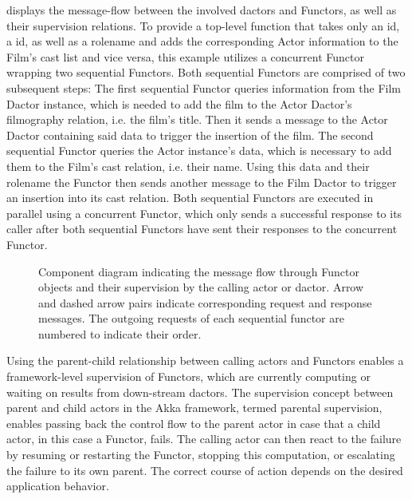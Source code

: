      displays the message-flow between the involved \glspl{dactor} and Functors, as well as their supervision relations.
    To provide a top-level function that takes only an  id, a  id, as well as a rolename and adds the corresponding Actor information to the Film's cast list and vice versa, this example utilizes a concurrent Functor wrapping two sequential Functors.
    Both sequential Functors are comprised of two subsequent steps:
    The first sequential Functor queries information from the Film Dactor instance, which is needed to add the film to the Actor Dactor's filmography \gls{relation}, i.e. the film's title.
    Then it sends a message to the Actor Dactor containing said data to trigger the insertion of the film.
    The second sequential Functor queries the Actor instance's data, which is necessary to add them to the Film's cast \gls{relation}, i.e. their name.
    Using this data and their rolename the Functor then sends another message to the Film Dactor to trigger an insertion into its cast \gls{relation}.
    Both sequential Functors are executed in parallel using a concurrent Functor, which only sends a successful response to its caller after both sequential Functors have sent their responses to the concurrent Functor.
    
    \begin{figure}[t]
      \centering
      
      \caption{Component diagram indicating the message flow through Functor objects and their supervision by the calling actor or \gls{dactor}. Arrow and dashed arrow pairs indicate corresponding request and response messages. The outgoing requests of each sequential functor are numbered to indicate their order.}
      \label{fig:functor_diagram}
    \end{figure}
    
    Using the parent-child relationship between calling actors and Functors enables a framework-level supervision of Functors, which are currently computing or waiting on results from down-stream \glspl{dactor}.
    The supervision concept between parent and child actors in the Akka framework, termed parental supervision, enables passing back the control flow to the parent actor in case that a child actor, in this case a Functor, fails.
    The calling actor can then react to the failure by resuming or restarting the Functor, stopping this computation, or escalating the failure to its own parent.
    The correct course of action depends on the desired application behavior.
  
